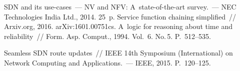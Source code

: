  \begin{multicols}{2}

\renewcommand{\bibname}{\protect\rmfamily Литература}

{\small\frenchspacing
{\baselineskip=10.5pt
\begin{thebibliography}{99}


 SDN and its use-cases~--- NV and NFV: A~state-of-the-art survey.~--- 
NEC Technologies India Ltd., 2014. 25~p.
Service function chaining simplified~// Arxiv.org, 2016. \mbox{arXiv}:1601.00751cs.
 A~logic for reasoning about time and reliability~// 
Form. Asp. Comput., 1994. Vol.~6. No.\,5. P.~512--535.

Seamless SDN route updates~// IEEE 14th Symposium (International)
 on Network Computing and Applications.~--- IEEE, 2015. P.~120--125.
 

\end{thebibliography}}}
\end{multicols}
